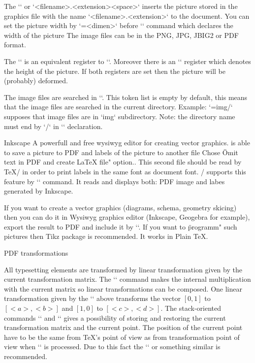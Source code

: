 {The `` or
`\inspic <filename>.<extension><space>`
inserts the picture stored in
the graphics file with the name `<filename>.<extension>` to the document. 
You can set the picture width by `\picw=<dimen>`
before `\inspic` command which declares the width of the picture 
The image files can be in the PNG, JPG, JBIG2 or PDF format. 

The `\picwidth` is an equivalent register to `\picw`. Moreover there is an
`\picheight` register which denotes the height of the picture. If both
registers are set then the picture will be (probably) deformed. 

The image files are searched in `\picdir`. This token list is empty 
by default, this means that the image files are searched in the 
current directory. Example: `\picdir={img/}` supposes that image files are
in `img` subdirectory. Note: the directory name must end by `/` in `\picdir`
declaration.

Inkscape\fnote
{A powerfull and free wysiwyg editor for creating vector graphics.} 
is able to save a picture to PDF and labels of the picture to another
file\fnote
{Chose \"Omit text in PDF and create LaTeX file" option.}. 
This second file should be read by \TeX/ in order to print labels
in the same font as document font. \OpTeX/ supports this feature by
`` command. It reads and displays both: PDF image
and labes generated by Inkscape.

If you want to create a vector graphics (diagrams, schema, geometry
skicing) then you can do it in Wysiwyg graphics editor (Inkscape, Geogebra for
example), export the result to PDF and include it by `\inspic`.
If you want to \"programm" such pictures then Tikz package is recommended.
It works in Plain \TeX. 

\secc PDF transformations

All typesetting elements are transformed by linear
transformation given by the current transformation matrix. The
`` command makes the internal multiplication
with the current matrix so linear transformations can be composed. 
One linear transformation given by the `\pdfsetmatrix` above transforms
the vector $[0,1]$ to $[<a>,<b>]$ and $[1,0]$ to $[<c>,<d>]$.
The stack-oriented commands `\pdfsave` and `\pdfrestore` gives a possibility of
storing and restoring the current transformation matrix and the current point.
The position of the current point have to be the same from \TeX{}'s point of
view as from transformation point of view when `\pdfrestore` is processed.
Due to this fact the `\pdfsave{}\pdfrestore` 
or something similar is recommended.

}
